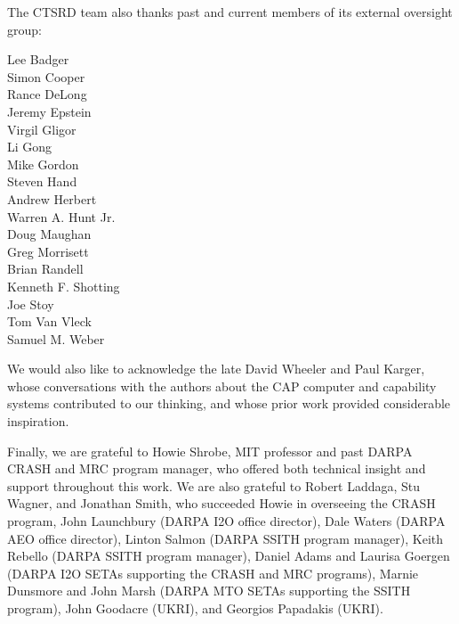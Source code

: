 \medskip

\noindent
The CTSRD team also thanks past and current members of its external oversight
group:

\medskip

\begin{small}
\noindent\begin{autogrid}{5}
Lee Badger \\
Simon Cooper \\
Rance DeLong \\
Jeremy Epstein \\
Virgil Gligor \\
Li Gong \\
Mike Gordon \\
Steven Hand \\
Andrew Herbert \\
Warren A. Hunt Jr. \\
Doug Maughan \\
Greg Morrisett \\
Brian Randell \\
Kenneth F. Shotting \\
Joe Stoy \\
Tom Van Vleck \\
Samuel M. Weber \\
\end{autogrid}
\end{small}

\medskip

\noindent
We would also like to acknowledge the late David Wheeler and Paul Karger,
whose conversations with the authors about the CAP computer and capability
systems contributed to our thinking, and whose prior work provided
considerable inspiration.

\medskip

\noindent
Finally, we are grateful to Howie Shrobe, MIT professor and past DARPA CRASH
and MRC program manager, who offered both technical insight and support
throughout this work.
We are also grateful to Robert Laddaga, Stu Wagner, and Jonathan Smith,
who succeeded Howie in overseeing the CRASH program,
John Launchbury (DARPA I2O office director),
Dale Waters (DARPA AEO office director),
Linton Salmon (DARPA SSITH program manager),
Keith Rebello (DARPA SSITH program manager),
Daniel Adams and Laurisa Goergen (DARPA I2O SETAs supporting the CRASH and MRC programs),
Marnie Dunsmore and John Marsh (DARPA MTO SETAs supporting the SSITH program),
John Goodacre (UKRI), and Georgios Papadakis (UKRI).
